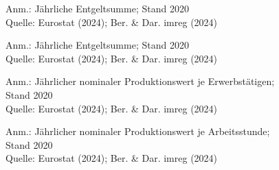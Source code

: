 \begin{figure}[p]
	{\centering {}}
	\label{map:entgeltprokopf}
	\begin{spacing}{1} \scriptsize
		Anm.: Jährliche Entgeltsumme; Stand 2020\\
		Quelle: Eurostat (2024); Ber. \& Dar. imreg (2024) 
	\end{spacing}
\end{figure}


\begin{figure}[p]
	{\centering {}}
	\label{map:entgeltprostunde}
	\begin{spacing}{1} \scriptsize
		Anm.: Jährliche Entgeltsumme; Stand 2020\\
		Quelle: Eurostat (2024); Ber. \& Dar. imreg (2024) 
	\end{spacing}
\end{figure}


\begin{figure}[p]
	{\centering {}}
	\label{map:prodprokopfnom}
	\begin{spacing}{1} \scriptsize
		Anm.: Jährlicher nominaler Produktionswert je Erwerbstätigen; Stand 2020\\
		Quelle: Eurostat (2024); Ber. \& Dar. imreg (2024) 
	\end{spacing}
\end{figure}


\begin{figure}[p]
	{\centering {}}
	\label{map:prodprostundenom}
	\begin{spacing}{1} \scriptsize
		Anm.: Jährlicher nominaler Produktionswert je Arbeitsstunde; Stand 2020\\
		Quelle: Eurostat (2024); Ber. \& Dar. imreg (2024) 
	\end{spacing}
\end{figure}


